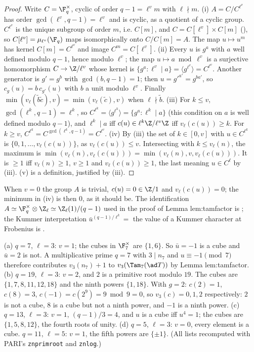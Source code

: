 \begin{proof}
Write $C=\F_q^\times$, cyclic of order $q-1=\ell^vm$ with $\ell\nmid m$. (i) $A=C/C^{\ell^v}$ has order $\gcd(\ell^v,q-1)=\ell^v$ and is cyclic, as a quotient of a cyclic
group. $C^{\ell^v}$ is the unique subgroup of order $m$, i.e. $C[m]$, and $C=C[\ell^v]\times C[m]$ (), so $C[\ell^v]=\mu_{\ell^v}(\F_q)$ maps
isomorphically onto $C/C[m]=A$. The map $u\mapsto u^m$ has kernel $C[m]=C^{\ell^v}$ and image $C^m=C[\ell^v]$.
(ii) Every $u$ is $g^a$ with $a$ well defined modulo $q-1$, hence modulo $\ell^v$; the map $u\mapsto a\bmod\ell^v$ is a surjective homomorphism
$C\to\Z/\ell^v$ whose kernel is $\{g^a:\ell^v\mid a\}=\langle g^{\ell^v}\rangle=C^{\ell^v}$. Another generator is $g'=g^b$ with $\gcd(b,q-1)=1$; then $u=g'^{a'}=g^{ba'}$, so
$c_g(u)=b\,c_{g'}(u)$ with $b$ a unit modulo $\ell^v$. Finally $\min(v_\ell(\tilde b\tilde c),v)=\min(v_\ell(\tilde c),v)$ when $\ell\nmid\tilde b$.
(iii) For $k\le v$, $\gcd(\ell^k,q-1)=\ell^k$, so $C^{\ell^k}=\langle g^{\ell^k}\rangle=\{g^a:\ell^k\mid a\}$ (this condition on $a$ is well defined modulo $q-1$), and $\ell^k\mid a$ iff
$c(u)\in\ell^k\Z/\ell^v\Z$ iff $v_\ell(c(u))\ge k$. For $k\ge v$, $C^{\ell^k}=C^{\gcd(\ell^k,q-1)}=C^{\ell^v}$.
(iv) By (iii) the set of $k\in[0,v]$ with $u\in C^{\ell^k}$ is $\{0,1,\dots,v_\ell(c(u))\}$, as $v_\ell(c(u))\le v$. Intersecting with $k\le v_\ell(n)$, the maximum is
$\min(v_\ell(n),v_\ell(c(u)))=\min(v_\ell(n),v,v_\ell(c(u)))$. It is $\ge1$ iff $v_\ell(n)\ge1$, $v\ge1$ and $v_\ell(c(u))\ge1$, the last meaning $u\in C^\ell$ by (iii).
(v) is a definition, justified by (iii).
\end{proof}

When $v=0$ the group $A$ is trivial, $c(u)=0\in\Z/1$ and $v_\ell(c(u))=0$; the minimum in (iv) is then $0$, as it should be. The
identification $A\simeq\F_q^\times\otimes\Z_\ell\simeq\Z_\ell(1)/(q-1)$ used in the proof of Lemma lem:tamfactor is ; the Kummer
interpretation $\bar u^{(q-1)/\ell^k}=$ the value of a Kummer character at Frobenius is .

\begin{example}\label{ex:rings:powers}
(a) $q=7$, $\ell=3$: $v=1$; the cubes in $\F_7^\times$ are $\{1,6\}$. So $\bar u=-1$ is a cube and $\bar u=2$ is not. A multiplicative prime $q=7$ with $3\mid n_7$
and $u\equiv-1\pmod7$ therefore contributes $v_3(n_7)+1$ to $v_3(\Tam_7(\ad T))$ by Lemma lem:tamfactor.
(b) $q=19$, $\ell=3$: $v=2$, and $2$ is a primitive root modulo $19$. The cubes are $\{1,7,8,11,12,18\}$ and the ninth powers $\{1,18\}$. With $g=2$:
$c(2)=1$, $c(8)=3$, $c(-1)=c(2^9)=9\bmod9=0$, so $v_3(c)=0,1,2$ respectively: $2$ is not a cube, $8$ is a cube but not a ninth power, and $-1$ is a
ninth power.
(c) $q=13$, $\ell=3$: $v=1$, $(q-1)/3=4$, and $u$ is a cube iff $u^4=1$; the cubes are $\{1,5,8,12\}$, the fourth roots of unity.
(d) $q=5$, $\ell=3$: $v=0$, every element is a cube. $q=11$, $\ell=5$: $v=1$, the fifth powers are $\{\pm1\}$.
(All lists recomputed with PARI's \texttt{znprimroot} and \texttt{znlog}.)
\end{example}

